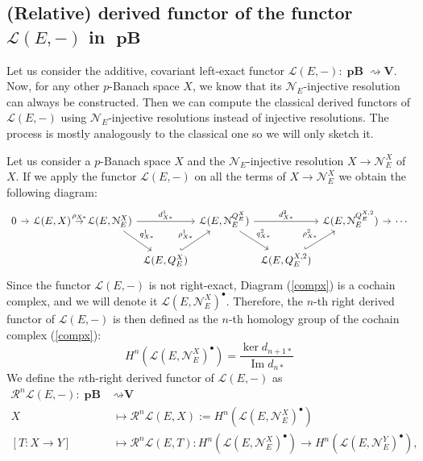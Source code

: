 \documentclass[12pt,a4paper]{amsproc}
\theoremstyle{remark}
\theoremstyle{definition}
\newcommand{\cL}{\mathcal{L}}
\newcommand{\cN}{\mathcal{N}}
\renewcommand\Im{\operatorname{Im}}
\newcommand{\pBan}{\operatorname{\textbf{pB}}}
\numberwithin{equation}{section}
\begin{document}
\subsection{(Relative) derived functor of the functor $\mathcal{L}(E,-)$ in $\pBan$}
Let us consider the additive, covariant left-exact functor $\mathcal{L}(E,-):\pBan \rightsquigarrow \boldsymbol{V}$. Now, for any other $p$-Banach space $X$, we know that its $\mathcal{N}_E$-injective resolution can always be constructed. Then we can compute the classical derived functors of $\mathcal{L}(E,-)$ using $\cN_E$-injective resolutions instead of injective resolutions. The process is mostly analogously to the classical one so we will only sketch it.
\par Let us consider a $p$-Banach space $X$ and the $\mathcal{N}_E$-injective resolution $X \to \mathcal{N}_E^X$ of $X$. If we apply the functor $\mathcal{L}(E,-)$ on all the terms of $X \to \mathcal{N}_E^X$ we obtain the following diagram:
\begin{equation}
	\label{compx}
	\begin{tikzcd}[column sep=0.09cm]
		0 \arrow[rrr] &&& \cL(E,X) \arrow[rrr, "\rho_{X*}"] &&& {\cL(E,\mathcal{N}_E^X)} \arrow[rd, "q_{X*}^1"] \arrow[rr, "d_{X*}^1"] &                                             & {\cL(E,\mathcal{N}_E^{Q_E^X})} \arrow[rd, "q_{X*}^2"] \arrow[rr, "d_{X*}^2"] &                                             & {\cL(E,\mathcal{N}_E^{Q_E^{X,2}})}  \arrow[rrr] &&& \cdots \\ & & & &
		&                       &                                                   & {\cL(E,Q_E^X)} \arrow[ru, "\rho_{X*}^1", hook] &                                                                & {\cL(E,Q_E^{X,2})} \arrow[ru, "\rho_{X*}^2", hook] &                                               
	\end{tikzcd}
\end{equation}
Since the functor $\cL(E,-)$ is not right-exact, Diagram (\ref{compx}) is a cochain complex, and we will denote it $\cL(E, \mathcal{N}_E^X)^{\bullet}$. Therefore, the $n$-th right derived functor of $\cL(E,-)$ is then defined as the $n$-th homology group of the cochain complex (\ref{compx}):
\begin{equation}
	H^n(\cL(E, \mathcal{N}_E^X)^{\bullet})=\frac{\ker d_{n+1*}}{\Im d_{n*}}
\end{equation}
We define the $n$th-right derived functor of $\mathcal{L}(E,-)$ as 
\begin{align*}
	\mathcal{R}^n\cL(E, -):  \pBan & \rightsquigarrow \textbf{V} \\
	X& \mapsto \mathcal{R}^n\cL(E,X):=H^n(\cL(E, \mathcal{N}_E^X)^{\bullet})\\
	[T:X\to Y]& \mapsto\mathcal{R}^n \cL(E, T): H^n(\cL(E, \mathcal{N}_E^X)^{\bullet})\longrightarrow H^n(\cL(E, \mathcal{N}_E^Y)^{\bullet}),
\end{align*}
\end{document}
